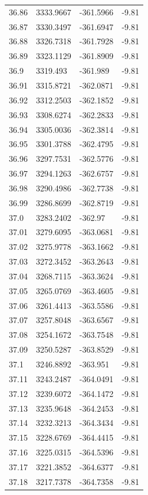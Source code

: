 \begin{table}[H]
\begin{tabular}{llll}
36.86 & 3333.9667 & -361.5966 & -9.81 \\
36.87 & 3330.3497 & -361.6947 & -9.81 \\
36.88 & 3326.7318 & -361.7928 & -9.81 \\
36.89 & 3323.1129 & -361.8909 & -9.81 \\
36.9 & 3319.493 & -361.989 & -9.81 \\
36.91 & 3315.8721 & -362.0871 & -9.81 \\
36.92 & 3312.2503 & -362.1852 & -9.81 \\
36.93 & 3308.6274 & -362.2833 & -9.81 \\
36.94 & 3305.0036 & -362.3814 & -9.81 \\
36.95 & 3301.3788 & -362.4795 & -9.81 \\
36.96 & 3297.7531 & -362.5776 & -9.81 \\
36.97 & 3294.1263 & -362.6757 & -9.81 \\
36.98 & 3290.4986 & -362.7738 & -9.81 \\
36.99 & 3286.8699 & -362.8719 & -9.81 \\
37.0 & 3283.2402 & -362.97 & -9.81 \\
37.01 & 3279.6095 & -363.0681 & -9.81 \\
37.02 & 3275.9778 & -363.1662 & -9.81 \\
37.03 & 3272.3452 & -363.2643 & -9.81 \\
37.04 & 3268.7115 & -363.3624 & -9.81 \\
37.05 & 3265.0769 & -363.4605 & -9.81 \\
37.06 & 3261.4413 & -363.5586 & -9.81 \\
37.07 & 3257.8048 & -363.6567 & -9.81 \\
37.08 & 3254.1672 & -363.7548 & -9.81 \\
37.09 & 3250.5287 & -363.8529 & -9.81 \\
37.1 & 3246.8892 & -363.951 & -9.81 \\
37.11 & 3243.2487 & -364.0491 & -9.81 \\
37.12 & 3239.6072 & -364.1472 & -9.81 \\
37.13 & 3235.9648 & -364.2453 & -9.81 \\
37.14 & 3232.3213 & -364.3434 & -9.81 \\
37.15 & 3228.6769 & -364.4415 & -9.81 \\
37.16 & 3225.0315 & -364.5396 & -9.81 \\
37.17 & 3221.3852 & -364.6377 & -9.81 \\
37.18 & 3217.7378 & -364.7358 & -9.81 \\

\end{tabular}
\end{table}
